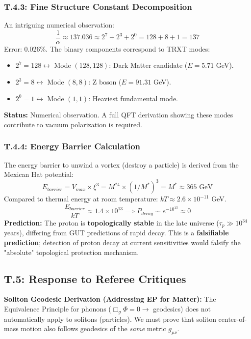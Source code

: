 \subsubsection{T.4.3: Fine Structure Constant Decomposition}
An intriguing numerical observation:
\begin{equation}
    \frac{1}{\alpha} \approx 137.036 \approx 2^7 + 2^3 + 2^0 = 128 + 8 + 1 = 137
\end{equation}
Error: 0.026\%. The binary components correspond to TRXT modes:
\begin{itemize}
    \item $2^7 = 128 \leftrightarrow$ Mode $(128, 128)$: Dark Matter candidate ($E = 5.71$ GeV).
    \item $2^3 = 8 \leftrightarrow$ Mode $(8, 8)$: Z boson ($E = 91.31$ GeV).
    \item $2^0 = 1 \leftrightarrow$ Mode $(1, 1)$: Heaviest fundamental mode.
\end{itemize}
\textbf{Status:} Numerical observation. A full QFT derivation showing these modes contribute to vacuum polarization is required.

\subsubsection{T.4.4: Energy Barrier Calculation}
The energy barrier to unwind a vortex (destroy a particle) is derived from the Mexican Hat potential:
\begin{equation}
    E_{barrier} = V_{max} \times \xi^3 = M^{*4} \times (1/M^*)^3 = M^* \approx 365 \text{ GeV}
\end{equation}
Compared to thermal energy at room temperature: $kT \approx 2.6 \times 10^{-11}$ GeV.
\begin{equation}
    \frac{E_{barrier}}{kT} \approx 1.4 \times 10^{13} \implies P_{decay} \sim e^{-10^{13}} \approx 0
\end{equation}
\textbf{Prediction:} The proton is \textbf{topologically stable} in the late universe ($\tau_p \gg 10^{34}$ years), differing from GUT predictions of rapid decay. This is a \textbf{falsifiable prediction}; detection of proton decay at current sensitivities would falsify the "absolute" topological protection mechanism.

\subsection{T.5: Response to Referee Critiques}

\textbf{Soliton Geodesic Derivation (Addressing EP for Matter):}
The Equivalence Principle for phonons ($\Box_g \Phi = 0 \to$ geodesics) does not automatically apply to solitons (particles). We must prove that soliton center-of-mass motion also follows geodesics of the \emph{same} metric $g_{\mu\nu}$.

